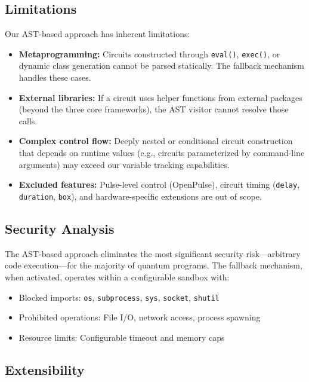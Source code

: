 \documentclass[conference]{IEEEtran}
\begin{document}
\subsection{Limitations}

Our AST-based approach has inherent limitations:

\begin{itemize}
    \item \textbf{Metaprogramming:} Circuits constructed through \texttt{eval()}, \texttt{exec()}, or dynamic class generation cannot be parsed statically. The fallback mechanism handles these cases.
    \item \textbf{External libraries:} If a circuit uses helper functions from external packages (beyond the three core frameworks), the AST visitor cannot resolve those calls.
    \item \textbf{Complex control flow:} Deeply nested or conditional circuit construction that depends on runtime values (e.g., circuits parameterized by command-line arguments) may exceed our variable tracking capabilities.
    \item \textbf{Excluded features:} Pulse-level control (OpenPulse), circuit timing (\texttt{delay}, \texttt{duration}, \texttt{box}), and hardware-specific extensions are out of scope.
\end{itemize}

\subsection{Security Analysis}

The AST-based approach eliminates the most significant security risk---arbitrary code execution---for the majority of quantum programs. The fallback mechanism, when activated, operates within a configurable sandbox with:
\begin{itemize}
    \item Blocked imports: \texttt{os}, \texttt{subprocess}, \texttt{sys}, \texttt{socket}, \texttt{shutil}
    \item Prohibited operations: File I/O, network access, process spawning
    \item Resource limits: Configurable timeout and memory caps
\end{itemize}

\subsection{Extensibility}
\end{document}
